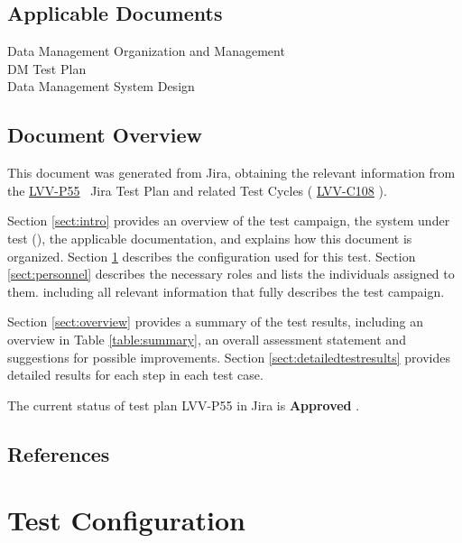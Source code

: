 \documentclass[DM,lsstdraft,STR,toc]{lsstdoc}
\begin{document}
\subsection{Applicable Documents}\label{applicable-documents}

 Data Management Organization and Management\\
 DM Test Plan\\
 Data Management System Design


\subsection{Document Overview}
\label{sect:docoverview}

This document was generated from Jira, obtaining the relevant information from the 
\href{https://jira.lsstcorp.org/secure/Tests.jspa#/testPlan/LVV-P55}{LVV-P55}
~Jira Test Plan and related Test Cycles (
  \href{https://jira.lsstcorp.org/secure/Tests.jspa#/testCycle/LVV-C108}{LVV-C108}
).

Section \ref{sect:intro} provides an overview of the test campaign, the system under test (\product{}),
the applicable documentation, and explains how this document is organized.
Section \ref{sect:configuration}  describes the configuration used for this test.
Section \ref{sect:personnel} describes the necessary roles and lists the individuals assigned to them.
including all relevant information that fully describes the test campaign.

Section \ref{sect:overview} provides a summary of the test results, including an overview in Table \ref{table:summary},
an overall assessment statement and suggestions for possible improvements.
Section \ref{sect:detailedtestresults} provides detailed results for each step in each test case.

The current status of test plan LVV-P55 in Jira is \textbf{ Approved }.

\subsection{References}
\label{sect:references}
\renewcommand{\refname}{}

\section{Test Configuration}
\label{sect:configuration}
\end{document}
